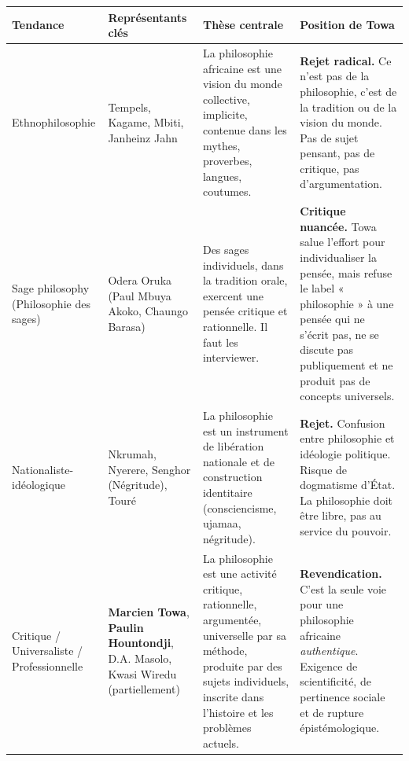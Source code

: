 \documentclass[11pt]{article}
\newcommand{\cle}[1]{{\popxbold\color{popdark}#1}}
\begin{document}
\begin{center}
\begin{tabularx}{\linewidth}{|l|X|X|X|}
\hline
\rowcolor{popblueL}
\textbf{Tendance} & \textbf{Représentants clés} & \textbf{Thèse centrale} & \textbf{Position de Towa} \\
\hline
\cle{Ethnophilosophie} & Tempels, Kagame, Mbiti, Janheinz Jahn & La philosophie africaine est une vision du monde collective, implicite, contenue dans les mythes, proverbes, langues, coutumes. & \textbf{Rejet radical.} Ce n'est pas de la philosophie, c'est de la \cle{tradition} ou de la \cle{vision du monde}. Pas de sujet pensant, pas de critique, pas d'argumentation. \\
\hline
\cle{Sage philosophy} (Philosophie des sages) & Odera Oruka (Paul Mbuya Akoko, Chaungo Barasa) & Des sages individuels, dans la tradition orale, exercent une pensée critique et rationnelle. Il faut les interviewer. & \textbf{Critique nuancée.} Towa salue l'effort pour individualiser la pensée, mais refuse le label « philosophie » à une pensée qui ne s'écrit pas, ne se discute pas publiquement et ne produit pas de concepts universels. \\
\hline
\cle{Nationaliste-idéologique} & Nkrumah, Nyerere, Senghor (Négritude), Touré & La philosophie est un instrument de libération nationale et de construction identitaire (consciencisme, ujamaa, négritude). & \textbf{Rejet.} Confusion entre philosophie et idéologie politique. Risque de dogmatisme d'État. La philosophie doit être libre, pas au service du pouvoir. \\
\hline
\cle{Critique / Universaliste / Professionnelle} & \textbf{Marcien Towa}, \textbf{Paulin Hountondji}, D.A. Masolo, Kwasi Wiredu (partiellement) & La philosophie est une activité critique, rationnelle, argumentée, universelle par sa méthode, produite par des sujets individuels, inscrite dans l'histoire et les problèmes actuels. & \textbf{Revendication.} C'est la seule voie pour une philosophie africaine \emph{authentique}. Exigence de scientificité, de pertinence sociale et de rupture épistémologique. \\
\hline
\end{tabularx}
\end{center}
\end{document}
